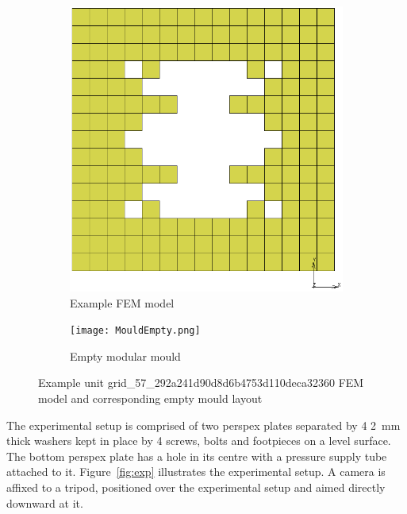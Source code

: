 \begin{figure}[H]
	\centering
	\begin{subfigure}[b]{0.3\textwidth}
		\centering
		\includegraphics[width=\textwidth]{MouldEmptyFEM.png}
		\caption{Example FEM model}
	\end{subfigure}
	\hfill
	\begin{subfigure}[b]{0.6\textwidth}
		\centering
		\texttt{[image: MouldEmpty.png]}
		\caption{Empty modular mould}
	\end{subfigure}
	\caption[Example unit FEM model and mould layout]{Example unit grid\_57\_292a241d90d8d6b4753d110deca32360 FEM model and corresponding empty mould layout}
	\label{fig:emptymould}
\end{figure}

The experimental setup is comprised of two perspex plates separated by 4 \SI{2}{mm} thick washers kept in place by 4 screws, bolts and footpieces on a level surface. The bottom perspex plate has a hole in its centre with a pressure supply tube attached to it. Figure~\ref{fig:exp} illustrates the experimental setup. A camera is affixed to a tripod, positioned over the experimental setup and aimed directly downward at it.

